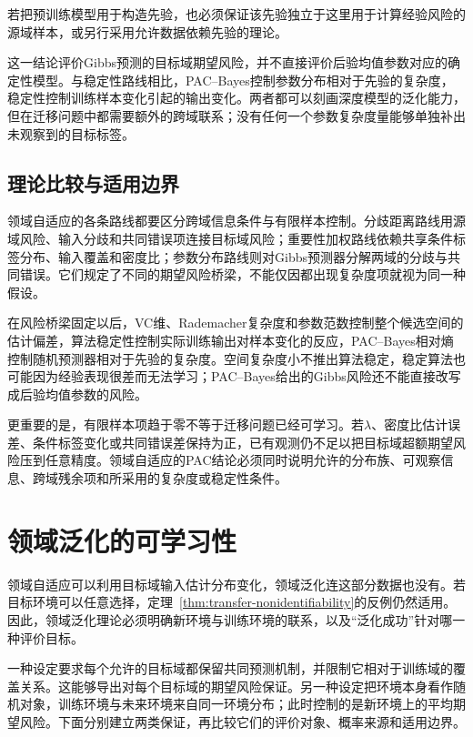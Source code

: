 若把预训练模型用于构造先验，也必须保证该先验独立于这里用于计算经验风险的源域样本，或另行采用允许数据依赖先验的理论。

这一结论评价Gibbs预测的目标域期望风险，并不直接评价后验均值参数对应的确定性模型。与稳定性路线相比，PAC--Bayes控制参数分布相对于先验的复杂度，稳定性控制训练样本变化引起的输出变化。两者都可以刻画深度模型的泛化能力，但在迁移问题中都需要额外的跨域联系；没有任何一个参数复杂度量能够单独补出未观察到的目标标签。

\subsection{理论比较与适用边界}
\label{sec:adaptation-comparison}

领域自适应的各条路线都要区分跨域信息条件与有限样本控制。分歧距离路线用源域风险、输入分歧和共同错误项连接目标域风险；重要性加权路线依赖共享条件标签分布、输入覆盖和密度比；参数分布路线则对Gibbs预测器分解两域的分歧与共同错误。它们规定了不同的期望风险桥梁，不能仅因都出现复杂度项就视为同一种假设。

在风险桥梁固定以后，VC维、Rademacher复杂度和参数范数控制整个候选空间的估计偏差，算法稳定性控制实际训练输出对样本变化的反应，PAC--Bayes相对熵控制随机预测器相对于先验的复杂度。空间复杂度小不推出算法稳定，稳定算法也可能因为经验表现很差而无法学习；PAC--Bayes给出的Gibbs风险还不能直接改写成后验均值参数的风险。

更重要的是，有限样本项趋于零不等于迁移问题已经可学习。若$\lambda$、密度比估计误差、条件标签变化或共同错误差保持为正，已有观测仍不足以把目标域超额期望风险压到任意精度。领域自适应的PAC结论必须同时说明允许的分布族、可观察信息、跨域残余项和所采用的复杂度或稳定性条件。

\section{领域泛化的可学习性}
\label{sec:domain-generalization}

领域自适应可以利用目标域输入估计分布变化，领域泛化连这部分数据也没有。若目标环境可以任意选择，定理~\ref{thm:transfer-nonidentifiability}的反例仍然适用。因此，领域泛化理论必须明确新环境与训练环境的联系，以及“泛化成功”针对哪一种评价目标。

一种设定要求每个允许的目标域都保留共同预测机制，并限制它相对于训练域的覆盖关系。这能够导出对每个目标域的期望风险保证。另一种设定把环境本身看作随机对象，训练环境与未来环境来自同一环境分布；此时控制的是新环境上的平均期望风险。下面分别建立两类保证，再比较它们的评价对象、概率来源和适用边界。

